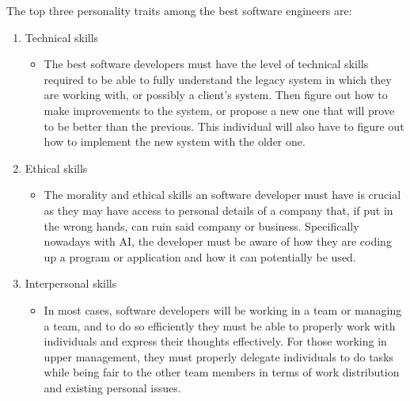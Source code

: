 	The top three personality traits among the best software engineers are:
	\begin{enumerate}
		\item Technical skills
			\begin{itemize}
				\item The best software developers must have the level of technical skills required to be able to fully understand the legacy system in which they are working with, or possibly a client's system. Then figure out how to make improvements to the system, or propose a new one that will prove to be better than the previous. This individual will also have to figure out how to implement the new system with the older one.
			\end{itemize}
		\item Ethical skills
			\begin{itemize}
				\item The morality and ethical skills an software developer must have is crucial as they may have access to personal details of a company that, if put in the wrong hands, can ruin said company or business. Specifically nowadays with AI, the developer must be aware of how they are coding up a program or application and how it can potentially be used. 
			\end{itemize}
		\item Interpersonal skills
			\begin{itemize}
				\item In most cases, software developers will be working in a team or managing a team, and to do so efficiently they must be able to properly work with individuals and express their thoughts effectively. For those working in upper management, they must properly delegate individuals to do tasks while being fair to the other team members in terms of work distribution and existing personal issues.
			\end{itemize}
	\end{enumerate}











